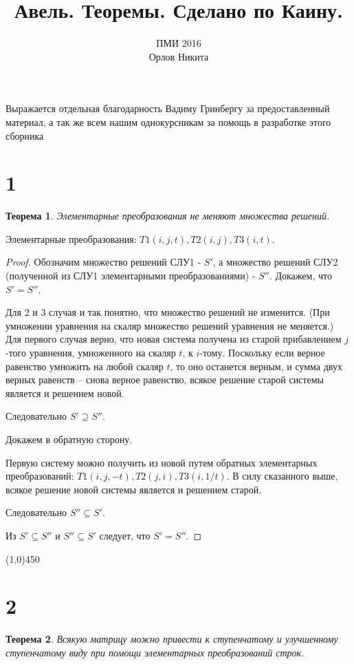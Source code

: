\documentclass[a4paper,12pt]{article}
\newtheorem*{ther}{Теорема}
\begin{document}
	\title{Авель. Теоремы. Сделано по Каину.}
	\author{ПМИ 2016 \\ Орлов Никита}
	\maketitle
	
	Выражается отдельная благодарность Вадиму Гринбергу за предоставленный материал, а так же всем нашим однокурсникам за помощь в разработке этого сборника
	
	\section*{1}
	\begin{ther}
		Элементарные преобразования не меняют множества решений. 
	\end{ther}
	Элементарные преобразования: $T1(i, j, t), T2(i, j), T3(i, t)$. 
	
	\begin{proof}
		Обозначим множество решений СЛУ1 - $S'$, а множество решений СЛУ2 (полученной из СЛУ1 элементарными преобразованиями) - $S''$. Докажем, что $S' = S''$. 
		
		Для 2 и 3 случая и так понятно, что множество решений не изменится. (При умножении уравнения на скаляр множество решений уравнения не меняется.) Для первого случая верно, что новая система получена из старой прибавлением $j$-того уравнения, умноженного на скаляр $t$, к $i$-тому. Поскольку если верное равенство умножить на любой скаляр $t$, то оно останется верным, и сумма двух верных равенств – снова верное равенство, всякое решение старой системы является и решением новой. 
		
		Следовательно $S' \supseteq S''$. 
		
		Докажем в обратную сторону. 
		
		Первую систему можно получить из новой путем обратных элементарных преобразований: 
		$T1(i, j, -t), T2(j, i), T3(i, 1/t)$. В силу сказанного выше, всякое решение новой системы является и решением старой. 
		
		Следовательно $S'' \subseteq S'$. 
		
		Из $S' \subseteq S''$ и $S'' \subseteq S'$ следует, что $S' = S''$.
	\end{proof}

	\begin{center}
		\line(1,0){450}
	\end{center}
	
	
	\section*{2}
	\begin{ther}
		Всякую матрицу можно привести к ступенчатому и улучшенному ступенчатому виду при помощи элементарных преобразований строк.
	\end{ther}
	
\end{document}
